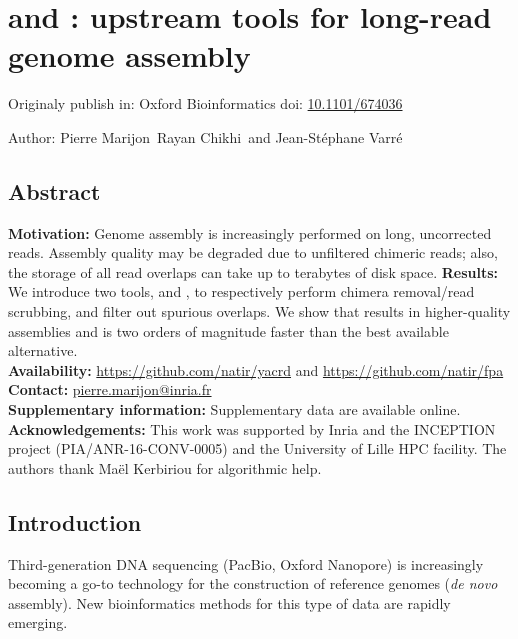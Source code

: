 \documentclass[./main.tex]{subfiles}
\begin{document}
\section{\yacrd and \fpa: upstream tools for long-read genome assembly}

Originaly publish in: Oxford Bioinformatics doi: \href{https://doi.org/10.1101/674036}{10.1101/674036}

Author: Pierre Marijon\, Rayan Chikhi\, and Jean-St\'ephane Varr\'e\


\subsection{Abstract}

\textbf{Motivation:} Genome assembly is increasingly performed on long, uncorrected reads. Assembly quality may be degraded due to unfiltered chimeric reads; also, the storage of all read overlaps can take up to terabytes of disk space. 
\textbf{Results:} We introduce two tools, \yacrd and \fpa, to respectively perform chimera removal/read scrubbing, and filter out spurious overlaps. We show that \yacrd results in higher-quality assemblies and is two orders of magnitude faster than the best available alternative.\\
\textbf{Availability:} \url{https://github.com/natir/yacrd} and \url{https://github.com/natir/fpa} \\
\textbf{Contact:} \href{pierre.marijon@inria.fr}{pierre.marijon@inria.fr}\\
\textbf{Supplementary information:} Supplementary data are available online.\\
\textbf{Acknowledgements:}
This work was supported by Inria and the INCEPTION project (PIA/ANR-16-CONV-0005) and the University of Lille HPC facility. The authors thank Maël Kerbiriou for algorithmic help.




\subsection{Introduction}

Third-generation DNA sequencing (PacBio, Oxford Nanopore) is increasingly becoming a go-to technology for the construction of reference genomes (\emph{de novo} assembly). New bioinformatics methods for this type of data are rapidly emerging.

\end{document}

